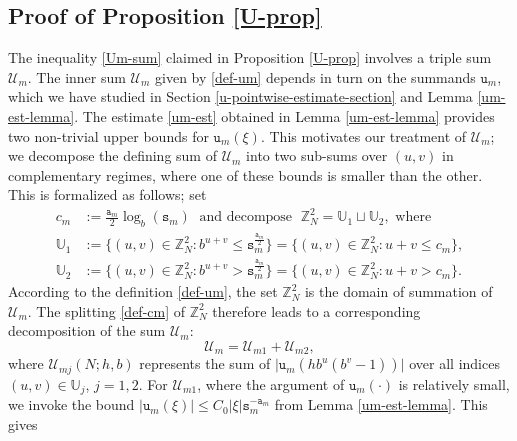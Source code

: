 \documentclass[12pt, twoside]{article}
\theoremstyle{definition}
\numberwithin{equation}{section}
\begin{document}
\subsection{Proof of Proposition \ref{U-prop}}\label{V-prop-proof}  
The inequality \eqref{Um-sum} claimed in Proposition \ref{U-prop} involves a triple sum $\mathcal U_m$. The inner sum $\mathscr{U}_m$ given by \eqref{def-um} depends in turn on the summands $\mathtt u_m$, which we have studied in Section \ref{u-pointwise-estimate-section} and Lemma \ref{um-est-lemma}.   
The estimate \eqref{um-est} obtained in Lemma \ref{um-est-lemma} provides two non-trivial upper bounds for $\mathtt u_m(\xi)$. %
This motivates our treatment of $\mathscr{U}_m$; we decompose the defining sum of $\mathscr{U}_m$ into two sub-sums over $(u, v)$ in complementary regimes, where one of these bounds is smaller than the other. This is formalized as follows; set     
\begin{align} 
c_m &:= \frac{\mathtt a_m}{2} \log_b(\mathtt s_m) \; \text{ and decompose } \; \mathbb Z_N^2 = \mathbb U_1 \sqcup \mathbb U_2, \text{ where }  \label{def-cm} \\ 
\mathbb U_1 &:= \bigl\{(u, v) \in \mathbb Z_{N}^2 : b^{u+v} \leq \mathtt s_m^{\frac{\mathtt a_m}{2}}\bigr\} = \bigl\{(u, v) \in \mathbb Z_N^2 : u+v \leq c_m \bigr\}, \nonumber \\  
\mathbb U_2 &:= \bigl\{(u, v) \in \mathbb Z_N^2 : b^{u+v} > \mathtt s_m^{\frac{\mathtt a_m}{2}}\bigr\} = \bigl\{(u,v) \in \mathbb Z_N^2 : u + v > c_m \bigr\}. \nonumber
\end{align} 
According to the definition \eqref{def-um}, the set $\mathbb Z_{N}^2$ is the domain of summation of $\mathscr{U}_m$. The splitting \eqref{def-cm} of $\mathbb Z_{N}^2$ therefore leads to a corresponding decomposition of the sum $\mathscr{U}_m$:
\begin{equation} 
\mathscr{U}_m = \mathscr{U}_{m1} + \mathscr{U}_{m2}, 
\end{equation}  
where $\mathscr{U}_{mj}(N; h, b)$ represents the sum of $\bigl|\mathtt u_m(hb^u (b^v-1)) \bigr|$ over all indices $(u, v) \in \mathbb U_j$, $j = 1,2$. For $\mathscr{U}_{m1}$, where the argument of $\mathtt u_m(\cdot)$ is relatively small, we invoke the bound $|\mathtt u_m(\xi)| \leq C_0 |\xi| \mathtt s_m^{-\mathtt a_m}$ from Lemma \ref{um-est-lemma}. This gives 
\end{document}
